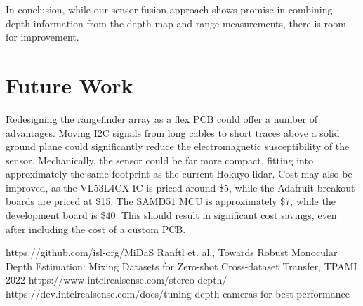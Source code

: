 \documentclass[conference]{IEEEtran}
\begin{document}
In conclusion, while our sensor fusion approach shows promise in combining depth information from the depth map and range measurements, there is room for improvement. 

\section{Future Work}
Redesigning the rangefinder array as a flex PCB could offer a number of
advantages. Moving I2C signals from long cables to short traces above a solid
ground plane could significantly reduce the electromagnetic susceptibility of
the sensor. Mechanically, the sensor could be far more compact, fitting into
approximately the same footprint as the current Hokuyo lidar. Cost may also be
improved, as the VL53L4CX IC is priced around \$5, while the Adafruit breakout
boards are priced at \$15. The SAMD51 MCU is approximately \$7, while the
development board is \$40. This should result in significant cost savings, even
after including the cost of a custom PCB.



\begin{thebibliography}{00}
 https://github.com/isl-org/MiDaS
 Ranftl et. al., Towards Robust Monocular Depth Estimation:
Mixing Datasets for Zero-shot Cross-dataset Transfer, TPAMI 2022
 https://www.intelrealsense.com/stereo-depth/
 https://dev.intelrealsense.com/docs/tuning-depth-cameras-for-best-performance
\end{thebibliography}
\end{document}
